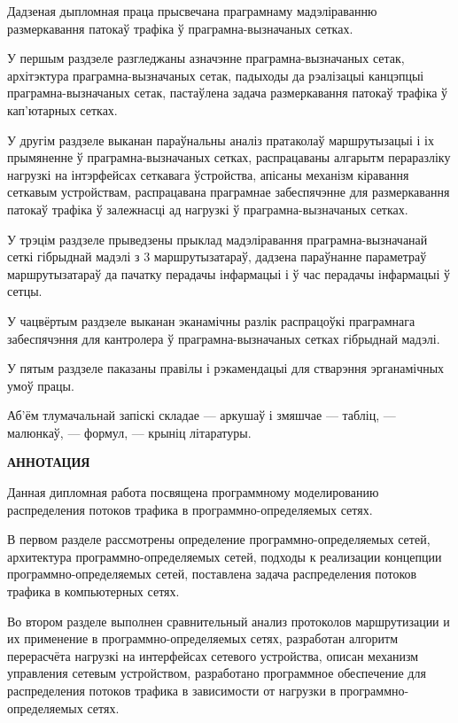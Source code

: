
Дадзеная дыпломная праца прысвечана праграмнаму мадэліраванню
размеркавання патокаў трафіка ў праграмна-вызначаных сетках.

У першым раздзеле разгледжаны азначэнне праграмна-вызначаных сетак,
архітэктура праграмна-вызначаных сетак, падыходы да рэалізацыі
канцэпцыі праграмна-вызначаных сетак, пастаўлена задача
размеркавання патокаў трафіка ў кап'ютарных сетках.

У другім раздзеле выканан параўнальны аналіз пратаколаў маршрутызацыі
і іх прымяненне ў праграмна-вызначаных сетках, распрацаваны алгарытм
пераразліку нагрузкі на інтэрфейсах сеткавага ўстройства,
апісаны механізм кіравання сеткавым устройствам, распрацавана
праграмнае забеспячэнне для размеркавання патокаў трафіка ў
залежнасці ад нагрузкі ў праграмна-вызначаных сетках.

У трэцім раздзеле прыведзены прыклад мадэліравання праграмна-вызначанай
сеткі гібрыднай мадэлі з 3 маршрутызатараў, дадзена параўнанне параметраў
маршрутызатараў да пачатку перадачы інфармацыі і ў час перадачы інфармацыі
ў сетцы.

У чацвёртым раздзеле выканан эканамічны разлік распрацоўкі праграмнага
забеспячэння для кантролера ў праграмна-вызначаных сетках гібрыднай мадэлі.

У пятым раздзеле паказаны правілы і рэкамендацыі для стварэння
эрганамічных умоў працы.

Аб'ём тлумачальнай запіскі складае --- аркушаў і змяшчае
--- табліц, --- малюнкаў, --- формул, --- крыніц літаратуры.

\clearpage

\begin{center}
\fontsize{14}{14}
\selectfont
\textbf{АННОТАЦИЯ}
\end{center}

Данная дипломная работа посвящена программному моделированию
распределения потоков трафика в программно-определяемых сетях.

В первом разделе рассмотрены определение программно-определяемых
сетей, архитектура программно-определяемых сетей, подходы к реализации
концепции программно-оп\-ре\-де\-ля\-емых сетей, поставлена задача распределения
потоков трафика в компьютерных сетях.

Во втором разделе выполнен сравнительный анализ протоколов маршрутизации
и их применение в программно-определяемых сетях, разработан алгоритм
перерасчёта нагрузкі на интерфейсах сетевого устройства, описан механизм
управления сетевым устройством, разработано программное обеспечение для
распределения потоков трафика в зависимости от нагрузки в программно-определяемых сетях.

